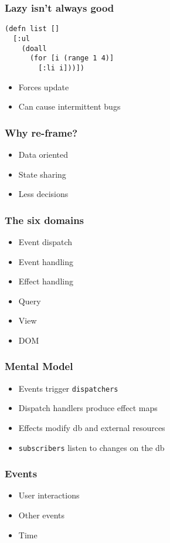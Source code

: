 \documentclass{beamer}
\newcommand{\code}[1]{{\color{secondary} \texttt{#1}}}
\begin{document}
  \begin{frame}[fragile]
    \frametitle{Lazy isn't always good}
    \begin{verbatim}
(defn list []
  [:ul
    (doall
      (for [i (range 1 4)]
        [:li i]))])
    \end{verbatim}
    \begin{itemize}
      \item Forces update
      \item Can cause intermittent bugs
    \end{itemize}
  \end{frame}

  \begin{frame}
    \frametitle{Why re-frame?}
    \begin{itemize}
      \item Data oriented
      \item State sharing
      \item Less decisions
    \end{itemize}
  \end{frame}

  \begin{frame}
    \frametitle{The six domains}
    \begin{itemize}
      \item Event dispatch
      \item Event handling
      \item Effect handling
      \item Query
      \item View
      \item DOM
    \end{itemize}
  \end{frame}

  \begin{frame}
    \frametitle{Mental Model}
    \begin{itemize}
      \item Events trigger \code{dispatchers}
      \item Dispatch handlers produce effect maps
      \item Effects modify db and external resources
      \item \code{subscribers} listen to changes on the db
    \end{itemize}
  \end{frame}

  \begin{frame}
    \frametitle{Events}
    \begin{itemize}
      \item User interactions
      \item Other events
      \item Time
    \end{itemize}
  \end{frame}
\end{document}

